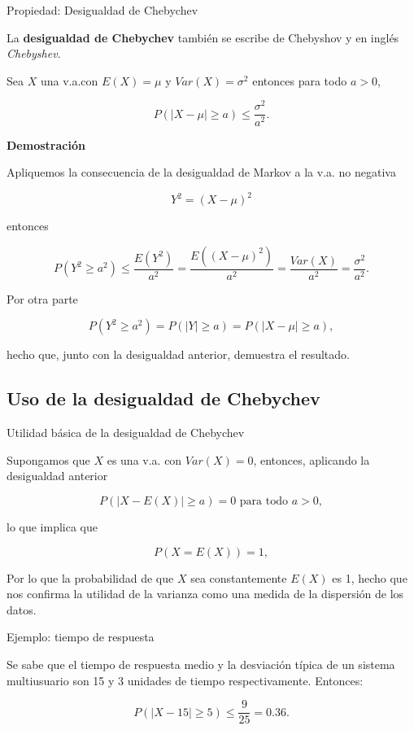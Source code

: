 \documentclass[
  letterpaper,
  DIV=11,
  numbers=noendperiod]{scrreprt}
\begin{document}
\begin{Proposicion}{Propiedad: Desigualdad de Chebychev}{}

La \textbf{desigualdad de Chebychev} también se escribe de Chebyshov y
en inglés \emph{Chebyshev}.

Sea \(X\) una v.a.con \(E(X)=\mu\) y \(Var(X)=\sigma^2\) entonces para
todo \(a>0\),

\[P(|X-\mu|\geq a)\leq \frac{\sigma^2}{a^2}.\]

\end{Proposicion}

\textbf{Demostración}

Apliquemos la consecuencia de la desigualdad de Markov a la v.a. no
negativa

\[Y^2=(X-\mu)^2\]

entonces

\[
P(Y^2\geq a^2) \leq 
\frac{E(Y^2)}{a^2}=\frac{E((X-\mu)^2)}{a^2}
= \frac{Var(X)}{a^2}=\frac{\sigma^2}{a^2}
.
\]

Por otra parte

\[
P(Y^2\geq a^2)=P(|Y|\geq a)= P(|X-\mu|\geq a),
\]

hecho que, junto con la desigualdad anterior, demuestra el resultado.

\subsection{Uso de la desigualdad de
Chebychev}\label{uso-de-la-desigualdad-de-chebychev}

\begin{Nota}{Utilidad básica de la desigualdad de Chebychev}{}

Supongamos que \(X\) es una v.a. con \(Var(X)=0\), entonces, aplicando
la desigualdad anterior

\[P(|X-E(X)|\geq a )=0\mbox{ para todo }a>0,\]

lo que implica que

\[P(X=E(X))=1,\]

Por lo que la probabilidad de que \(X\) sea constantemente \(E(X)\) es
1, hecho que nos confirma la utilidad de la varianza como una medida de
la dispersión de los datos.

\end{Nota}

\begin{Ejemplo}{Ejemplo: tiempo de respuesta}{}

Se sabe que el tiempo de respuesta medio y la desviación típica de un
sistema multiusuario son 15 y 3 unidades de tiempo respectivamente.
Entonces:

\[
P(|X-15|\geq 5)\leq \frac9{25}=0.36.
\]

\end{Ejemplo}
\end{document}
